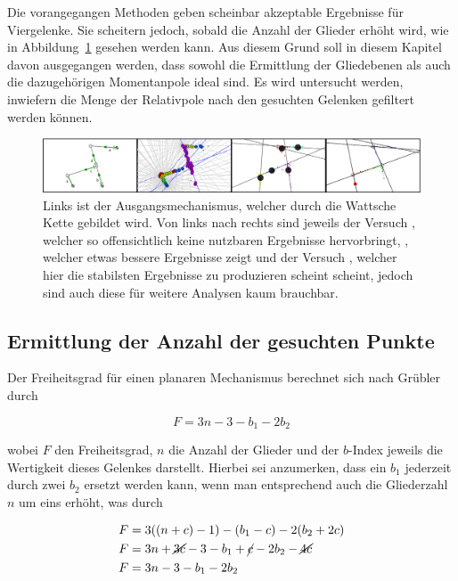 Die vorangegangen Methoden geben scheinbar akzeptable Ergebnisse für Viergelenke.
Sie scheitern jedoch, sobald die Anzahl der Glieder erhöht wird, wie in Abbildung~\ref{fig:gruppe1_3_2_6_3_4} gesehen werden kann.
Aus diesem Grund soll in diesem Kapitel davon ausgegangen werden, dass sowohl die Ermittlung der Gliedebenen als auch die dazugehörigen Momentanpole ideal sind.
Es wird untersucht werden, inwiefern die Menge der Relativpole nach den gesuchten Gelenken gefiltert werden können.

\begin{figure}
    \includegraphics[width=\textwidth]{gfx/gruppe_failed_edit.png}
    \caption[Versuche ,  und .]{Links ist der Ausgangsmechanismus, welcher durch die Wattsche Kette gebildet wird. Von links nach rechts sind jeweils der Versuch , welcher so offensichtlich keine nutzbaren Ergebnisse hervorbringt, , welcher etwas bessere Ergebnisse zeigt und der Versuch , welcher hier die stabilsten Ergebnisse zu produzieren scheint scheint, jedoch sind auch diese für weitere Analysen kaum brauchbar.}
    \label{fig:gruppe1_3_2_6_3_4}
\end{figure}

\subsection{Ermittlung der Anzahl der gesuchten Punkte}

Der Freiheitsgrad für einen planaren Mechanismus berechnet sich nach Grübler durch~\cite{Goessner2016}

\begin{equation}
    F = 3n - 3 - b_1 - 2b_2
    \label{eq:gruebler}
\end{equation}

wobei $F$ den Freiheitsgrad, $n$ die Anzahl der Glieder und der $b$-Index jeweils die Wertigkeit dieses Gelenkes darstellt.
Hierbei sei anzumerken, dass ein $b_1$ jederzeit durch zwei $b_2$ ersetzt werden kann, wenn man entsprechend auch die Gliederzahl $n$ um eins erhöht, was durch

\begin{equation}
    \begin{split}
        F &= 3((n+c)-1) - (b_1 - c) - 2(b_2 + 2c) \\
        F &= 3n + \cancel{3c} - 3 - b_1 + \cancel{c} - 2b_2 - \cancel{4c} \\
        F &= 3n - 3 - b_1 - 2b_2
    \end{split}
\end{equation}

